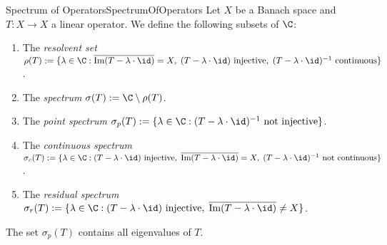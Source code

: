 \begin{mdef}{Spectrum of Operators}{SpectrumOfOperators}
    Let $X$ be a Banach space and $T:X\to X$ a linear operator. We define the following subsets of $\C$:
    \begin{enumerate}[label=(\alph*)]
        \item The \emph{resolvent set} $\rho(T):=\{\lambda\in\C:\overline{\text{Im}(T - \lambda\cdot\id)} = X,\;(T-\lambda\cdot\id)\text{ injective},\;(T - \lambda\cdot\id)^{-1}\text{ continuous}\}$.
        \item The \emph{spectrum} $\sigma(T):=\C\setminus\rho(T)$.
        \item The \emph{point spectrum} $\sigma_p(T):=\{\lambda\in\C:(T-\lambda\cdot\id)^{-1}\text{ not injective}\}$.
        \item The \emph{continuous spectrum} $\sigma_c(T):=\{\lambda\in\C:(T-\lambda\cdot\id)\text{ injective},\;\overline{\text{Im}(T - \lambda\cdot\id)} = X,\;(T - \lambda\cdot\id)^{-1}\text{ not continuous}\}$.
        \item The \emph{residual spectrum} $\sigma_r(T):=\{\lambda\in\C:(T-\lambda\cdot\id)\text{ injective},\;\overline{\text{Im}(T - \lambda\cdot\id)}\neq X\}$.
    \end{enumerate}
    The set $\sigma_p(T)$ contains all eigenvalues of $T$.
\end{mdef}